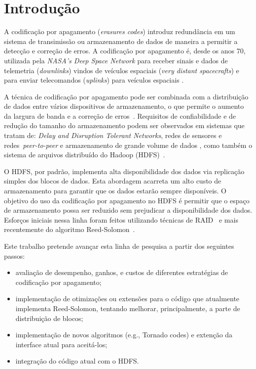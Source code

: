 \chapter{Introdução}

A codificação por apagamento (\emph{erasures codes}) introduz
redundância em um sistema de transimissão ou armazenamento de dados de
maneira a permitir a detecção e correção de erros. A codificação por
apagamento é, desde os anos 70, utilizada pela \emph{NASA's Deep Space
  Network} para receber sinais e dados de telemetria
(\emph{downlinks}) vindos de veículos espaciais (\emph{very distant
  spacecrafts}) e para enviar telecomandos (\emph{uplinks}) para
veículos espaciais \cite{Almeida:2007, STO:2010, TDD:2010}.

A técnica de codificação por apagamento pode ser combinada com a
distribuição de dados entre vários dispositivos de armazenamento, o
que permite o aumento da largura de banda e a correção de
erros~\cite{Woitaszek:2007, Plank:1997}. Requisitos de confiabilidade
e de redução do tamanho do armazenamento podem ser observados em
sistemas que tratam de: 
\emph{Delay and Disruption Tolerant Networks}, redes de sensores e
redes~\emph{peer-to-peer} \cite{Bhagwan:2004, Haeberlen:2005,
Rodrigues:2005, RTAD:2007, Wilcox-O'Hearn:2008, Houri:2009} e
armazenamento de grande volume de dados \cite{Anderson:1998,
Kubiatowicz:2000, Schmuck:2002, Saito:2004, Xia:2006, Storer:2008,
Storer:2009}, como também o sistema de arquivos distribuído do
Hadoop (HDFS)~\cite{HDFS-503:2010}.

O HDFS, por padrão, implementa alta disponibilidade dos dados via
replicação simples dos blocos de dados. Esta abordagem acarreta um
alto custo de armazenamento para garantir que os dados estarão sempre
disponíveis. O objetivo do uso da codificação por apagamento no HDFS é
permitir que o espaço de armazenamento possa ser reduzido sem
prejudicar a disponibilidade dos dados. Esforços iniciais nessa linha
foram feitos utilizando técnicas de RAID~\cite{HDFS-503:2010} e mais
recentemente do algoritmo Reed-Solomon~\cite{MR-1969:2010}.

Este trabalho pretende avançar esta linha de pesquisa a partir dos
seguintes passos:

\begin{itemize}
\item avaliação de desempenho, ganhos, e custos de diferentes
  estratégias de codificação por apagamento;

\item implementação de otimizações ou extensões para o código que
  atualmente implementa Reed-Solomon, tentando melhorar,
  principalmente, a parte de distribuição de blocos;

\item implementação de novos algoritmos (e.g., Tornado codes) e
  extenção da interface atual para aceitá-los;

\item integração do código atual com o HDFS.

\end{itemize}

